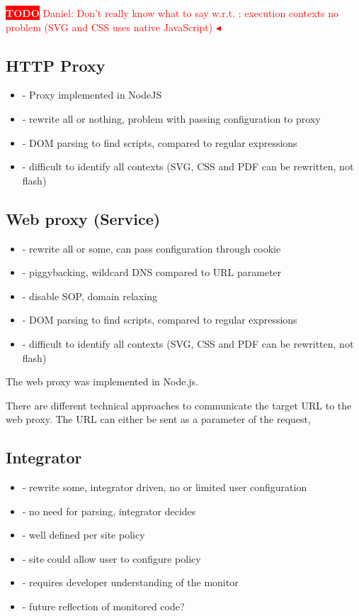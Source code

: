 \documentclass{llncs}
\newcommand{\todo}[1]{\colorbox{red}{\textcolor{white}{\sffamily\bfseries\scriptsize TODO}} \textcolor{red}{#1} \textcolor{red}{$\blacktriangleleft$}}
\begin{document}
\todo{Daniel: Don't really know what to say w.r.t. : execution contexts no problem (SVG and CSS uses native JavaScript)}


\subsection{HTTP Proxy}

\begin{itemize}
\item- Proxy implemented in NodeJS
\item- rewrite all or nothing, problem with passing configuration to proxy
\item- DOM parsing to find scripts, compared to regular expressions
\item- difficult to identify all contexts (SVG, CSS and PDF can be rewritten, not flash)
\end{itemize}



\subsection{Web proxy (Service)}

\begin{itemize}
\item- rewrite all or some, can pass configuration through cookie
\item- piggybacking, wildcard DNS compared to URL parameter
\item- disable SOP, domain relaxing
\item- DOM parsing to find scripts, compared to regular expressions
\item- difficult to identify all contexts (SVG, CSS and PDF can be rewritten, not flash)
\end{itemize}

The web proxy was implemented in Node.js. 

There are different technical approaches to communicate the target URL to the web 
proxy. The URL can either be sent as a parameter of the request, 

\subsection{Integrator}

\begin{itemize}
\item- rewrite some, integrator driven, no or limited user configuration
\item- no need for parsing, integrator decides
\item- well defined per site policy
\item- site could allow user to configure policy
\item- requires developer understanding of the monitor
\item- future reflection of monitored code?
\end{itemize}
\end{document}
